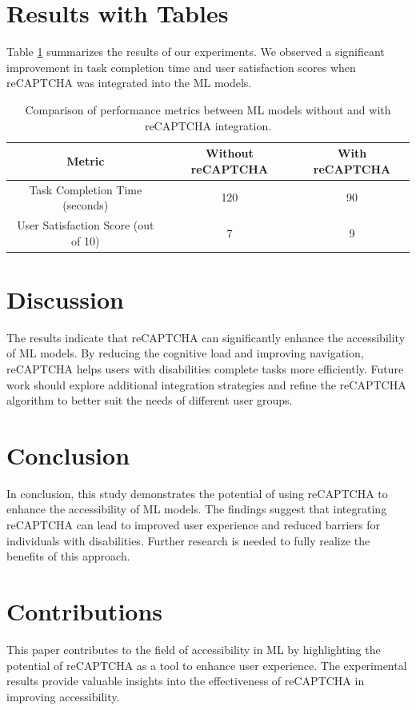\documentclass{article}
\begin{document}
\section{Results with Tables}
Table \ref{table:results} summarizes the results of our experiments. We observed a significant improvement in task completion time and user satisfaction scores when reCAPTCHA was integrated into the ML models.

\begin{table}[ht]
\centering
\begin{tabular}{|c|c|c|}
\hline
\textbf{Metric} & \textbf{Without reCAPTCHA} & \textbf{With reCAPTCHA} \\
\hline
Task Completion Time (seconds) & 120 & 90 \\
User Satisfaction Score (out of 10) & 7 & 9 \\
\hline
\end{tabular}
\caption{Comparison of performance metrics between ML models without and with reCAPTCHA integration.}
\label{table:results}
\end{table}

\section{Discussion}
The results indicate that reCAPTCHA can significantly enhance the accessibility of ML models. By reducing the cognitive load and improving navigation, reCAPTCHA helps users with disabilities complete tasks more efficiently. Future work should explore additional integration strategies and refine the reCAPTCHA algorithm to better suit the needs of different user groups.

\section{Conclusion}
In conclusion, this study demonstrates the potential of using reCAPTCHA to enhance the accessibility of ML models. The findings suggest that integrating reCAPTCHA can lead to improved user experience and reduced barriers for individuals with disabilities. Further research is needed to fully realize the benefits of this approach.

\section{Contributions}
This paper contributes to the field of accessibility in ML by highlighting the potential of reCAPTCHA as a tool to enhance user experience. The experimental results provide valuable insights into the effectiveness of reCAPTCHA in improving accessibility.
\end{document}
